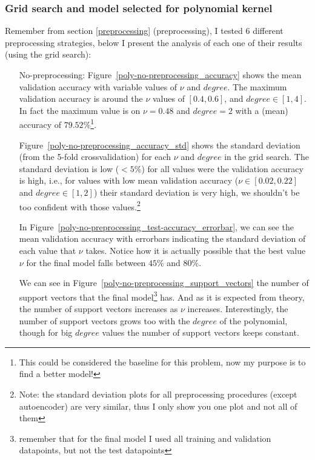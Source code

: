 \documentclass[format=acmtog]{acmart}
\begin{document}
\subsubsection{Grid search and model selected for polynomial
kernel}\label{grid-search-and-model-selected-for-polynomial-kernel}

Remember from section \ref{preprocessing} (preprocessing), I tested 6
different preprocessing strategies, below I present the analysis of each
one of their results (using the grid search):

\begin{itemize}
  \item[No-preprocessing:] Figure~\ref{poly-no-preprocessing_accuracy} shows the mean
  validation accuracy with variable values of $\nu$ and $degree$. The maximum validation
  accuracy is around the $\nu$ values of $[0.4,0.6]$, and $degree \in [1,4]$. In fact the
  maximum value is on $\nu = 0.48$ and $degree = 2$ with a (mean) accuracy of
  $79.52\%$\footnote{This could be considered the baseline for this problem, now my
  purpose is to find a better model!}.

  Figure~\ref{poly-no-preprocessing_accuracy_std} shows the standard deviation (from the
  5-fold crossvalidation) for each $\nu$ and $degree$ in the grid search. The standard
  deviation is low ($<5\%$) for all values were the validation accuracy is high, i.e., for
  values with low mean validation accuracy ($\nu \in [0.02,0.22]$ and $degree \in [1,2]$)
  their standard deviation is very high, we shouldn't be too confident with those
  values.\footnote{Note: the standard deviation plots for all preprocessing procedures
  (except autoencoder) are very similar, thus I only show you one plot and not all of
  them}

  In Figure~\ref{poly-no-preprocessing_test-accuracy_errorbar}, we can see the mean
  validation accuracy with errorbars indicating the standard deviation of each value that
  $\nu$ takes. Notice how it is actually possible that the best value $\nu$ for the final
  model falls between $45\%$ and $80\%$.

  We can see in Figure~\ref{poly-no-preprocessing_support_vectors} the number of support
  vectors that the final model\footnote{remember that for the final model I used all
  training and validation datapoints, but not the test datapoints} has.  And as it is
  expected from theory, the number of support vectors increases as $\nu$ increases.
  Interestingly, the number of support vectors grows too with the $degree$ of the
  polynomial, though for big $degree$ values the number of support vectors keeps constant.
\end{itemize}
\end{document}
